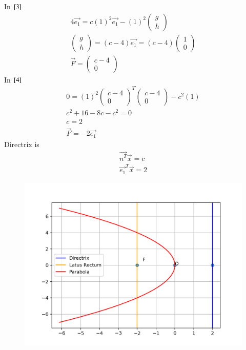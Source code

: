 \documentclass[a5paper,10pt]{article}
\begin{document}
In $\eqref{3}$
\begin{align}
    4\vec{e_1}=c(1)^2\vec{e_1}-(1)^2\begin{pmatrix}g\\h\end{pmatrix}\\
    \begin{pmatrix}g\\h\end{pmatrix}=(c-4)\vec{e_1}=(c-4)\begin{pmatrix}1\\0\end{pmatrix}\\
    \vec{F}=\begin{pmatrix}c-4\\0\end{pmatrix}
\end{align}
In $\eqref{4}$
\begin{align}
    0=(1)^2\begin{pmatrix}c-4\\0\end{pmatrix}^T\begin{pmatrix}c-4\\0\end{pmatrix}-c^2(1)\\
    c^2+16-8c-c^2=0\\
    c=2\\
    \vec{F}=-2\vec{e_1}
\end{align}
Directrix is
\begin{align}
    \vec{n^T}\vec{x}=c\\
    \vec{e_1}^T\vec{x}=2
\end{align}
\begin{figure}[H]
    \centering
    \includegraphics[width=\columnwidth]{figs/figure.png}
    \caption{}
    \label{fig:placeholder}
\end{figure}
\end{document}
